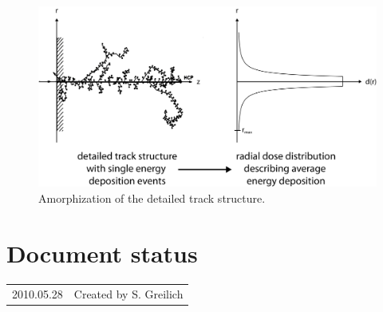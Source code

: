 \begin{figure}
	\centering
		\includegraphics[width=1.0\textwidth]{pictures/TrackStructureDetailAndRDD.png}
	\caption{Amorphization of the detailed track structure.}
	\label{fig:TST}
\end{figure}





\section*{Document status}
\begin{tabular}{l l}
2010.05.28&Created by S. Greilich
\end{tabular}